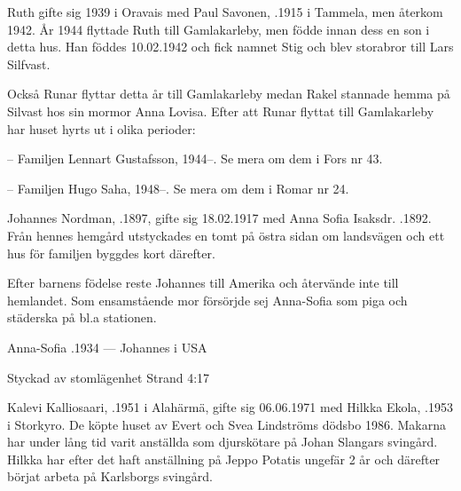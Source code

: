 Ruth gifte sig 1939 i Oravais med  Paul Savonen, .1915 i Tammela, men återkom 1942. År 1944 flyttade Ruth till Gamlakarleby, men födde innan dess en son i detta hus. Han föddes 10.02.1942 och fick namnet Stig och blev storabror till Lars Silfvast.

Också Runar flyttar detta år till Gamlakarleby medan Rakel stannade hemma på Silvast hos sin mormor Anna Lovisa. Efter att Runar flyttat till Gamlakarleby har huset hyrts ut i olika perioder:

-- Familjen Lennart Gustafsson, 1944--. Se mera om dem i Fors nr 43.

-- Familjen Hugo Saha, 1948--. Se mera om dem i Romar nr 24.


Johannes Nordman, .1897, gifte sig 18.02.1917 med Anna Sofia Isaksdr. .1892. Från hennes hemgård utstyckades en tomt på östra sidan om landsvägen och ett hus för familjen byggdes kort därefter.

Efter barnens födelse reste Johannes till Amerika och återvände inte till hemlandet. Som ensamstående mor försörjde sej Anna-Sofia som piga och städerska på bl.a stationen.
\begin{jhchildren}
  \item {}
  \item {}
  \item {}
\end{jhchildren}

Anna-Sofia .1934  ---  Johannes   i USA



Styckad av stomlägenhet Strand 4:17


Kalevi Kalliosaari, .1951 i Alahärmä, gifte sig 06.06.1971 med Hilkka Ekola, .1953 i Storkyro. De köpte huset av Evert och Svea Lindströms dödsbo 1986. Makarna har under lång tid varit anställda som djurskötare på Johan Slangars svingård. Hilkka har efter det haft anställning på Jeppo Potatis ungefär 2 år och därefter börjat arbeta på Karlsborgs svingård.

